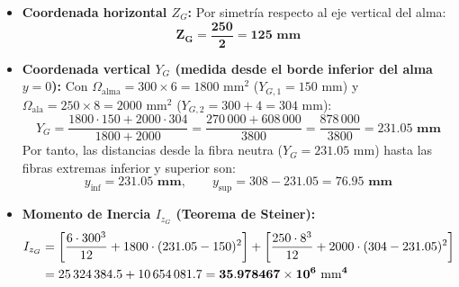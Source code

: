 {    \tcblower


    \begin{itemize}
        \item \textbf{Coordenada horizontal $Z_G$:} Por simetría respecto al eje vertical del alma:
              \begin{equation}
                  \mathbf{Z_G = \frac{250}{2} = 125\text{ mm}}
              \end{equation}
        \item \textbf{Coordenada vertical $Y_G$ (medida desde el borde inferior del alma $y = 0$):}
              Con $\Omega_{\text{alma}} = 300 \times 6 = 1800\text{ mm}^2$ ($Y_{G,1} = 150\text{ mm}$) y $\Omega_{\text{ala}} = 250 \times 8 = 2000\text{ mm}^2$ ($Y_{G,2} = 300 + 4 = 304\text{ mm}$):
              \begin{equation}
                  Y_G = \frac{1800 \cdot 150 + 2000 \cdot 304}{1800 + 2000} = \frac{270\,000 + 608\,000}{3800} = \frac{878\,000}{3800} = \mathbf{231.05\text{ mm}}
              \end{equation}
              Por tanto, las distancias desde la fibra neutra ($Y_G = 231.05\text{ mm}$) hasta las fibras extremas inferior y superior son:
              \begin{equation}
                  y_{\text{inf}} = \mathbf{231.05\text{ mm}}, \qquad y_{\text{sup}} = 308 - 231.05 = \mathbf{76.95\text{ mm}}
              \end{equation}
        \item \textbf{Momento de Inercia $I_{z_G}$ (Teorema de Steiner):}
              \begin{align}
                  I_{z_G} & = \left[ \frac{6 \cdot 300^3}{12} + 1800 \cdot (231.05 - 150)^2 \right] + \left[ \frac{250 \cdot 8^3}{12} + 2000 \cdot (304 - 231.05)^2 \right] \notag \\
                          & = 25\,324\,384.5 + 10\,654\,081.7 = \mathbf{35.978467 \times 10^6\text{ mm}^4}
              \end{align}
    \end{itemize}


}

